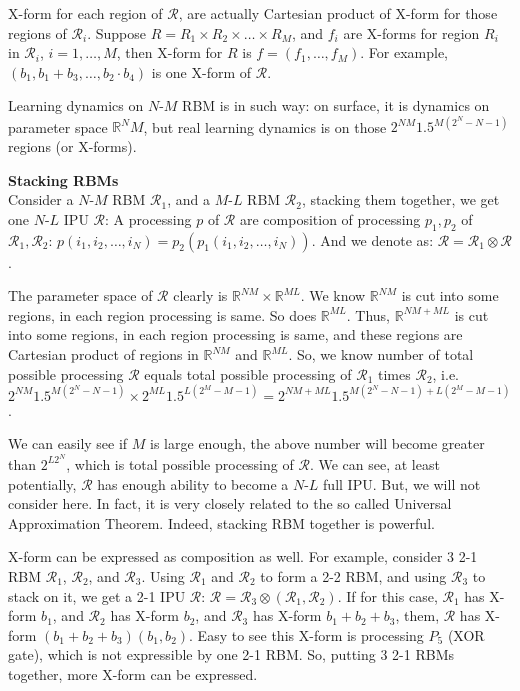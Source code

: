 X-form for each region of $\mathcal{R}$, are actually Cartesian product of X-form for those regions of $\mathcal{R}_i$. Suppose $R = R_1 \times R_2 \times \ldots \times R_M$, and $f_i$ are X-forms for region $R_i$ in $\mathcal{R}_i$, $i=1, \ldots, M$, then X-form for $R$ is $f = (f_1, \ldots, f_M)$.  For example, $(b_1, b_1+b_3, \ldots, b_2 \cdot b_4)$ is one X-form of $\mathcal{R}$. 

Learning dynamics on $N$-$M$ RBM is in such way: on surface, it is dynamics on parameter space $\mathbb{R}^NM$, but real learning dynamics is on those  $2^{NM} 1.5^{M(2^N-N-1)}$ regions (or X-forms). 
\bigskip




{\bf Stacking RBMs} \\
Consider a $N$-$M$ RBM $\mathcal{R}_1$, and a $M$-$L$ RBM $\mathcal{R}_2$, stacking them together, we get one $N$-$L$ IPU $\mathcal{R}$: A processing $p$ of $\mathcal{R}$ are composition of processing $p_1, p_2$ of $\mathcal{R}_1, \mathcal{R}_2$: $p(i_1, i_2, \ldots, i_N) = p_2 ( p_1(i_1, i_2, \ldots, i_N) )$. And we denote as: $\mathcal{R} = \mathcal{R}_1 \otimes \mathcal{R}$.

The parameter space of $\mathcal{R}$ clearly is $\mathbb{R}^{NM} \times \mathbb{R}^{ML}$. We know $\mathbb{R}^{NM}$ is cut into some regions, in each region processing is same. So does $\mathbb{R}^{ML}$. Thus, $\mathbb{R}^{NM + ML}$ is cut into some regions, in each region processing is same, and these regions are Cartesian product of regions in $\mathbb{R}^{NM}$ and $\mathbb{R}^{ML}$. So, we know number of total possible processing $\mathcal{R}$ equals total possible processing of $\mathcal{R}_1$ times $\mathcal{R}_2$, i.e. 
$2^{NM} 1.5^{M(2^N-N-1)} \times 2^{ML} 1.5^{L(2^M-M-1)} = 2^{NM+ML} 1.5^{M(2^N-N-1) + L(2^M-M-1)}$. 

We can easily see if $M$ is large enough, the above number will become greater than $2^{L2^N}$, which is total possible processing of $\mathcal{R}$. We can see, at least potentially, $\mathcal{R}$ has enough ability to become a $N$-$L$ full IPU. But, we will not consider here. In fact, it is very closely related to the so called Universal Approximation Theorem. Indeed, stacking RBM together is powerful. 

X-form can be expressed as composition as well. For example, consider 3 2-1 RBM $\mathcal{R}_1$, $\mathcal{R}_2$, and $\mathcal{R}_3$. Using $\mathcal{R}_1$ and $\mathcal{R}_2$ to form a 2-2 RBM, and using $\mathcal{R}_3$ to stack on it, we get a 2-1 IPU $\mathcal{R}$: $\mathcal{R} = \mathcal{R}_3 \otimes (\mathcal{R}_1, \mathcal{R}_2)$. If for this case, $\mathcal{R}_1$ has X-form $b_1$, and $\mathcal{R}_2$ has X-form $b_2$, and $\mathcal{R}_3$ has X-form $b_1 + b_2 + b_3$, them, $\mathcal{R}$ has X-form $(b_1 + b_2 + b_3) (b_1, b_2)$. Easy to see this X-form is processing $P_5$ (XOR gate), which is not expressible by one 2-1 RBM. So, putting 3 2-1 RBMs together, more X-form can be expressed.
\bigskip






